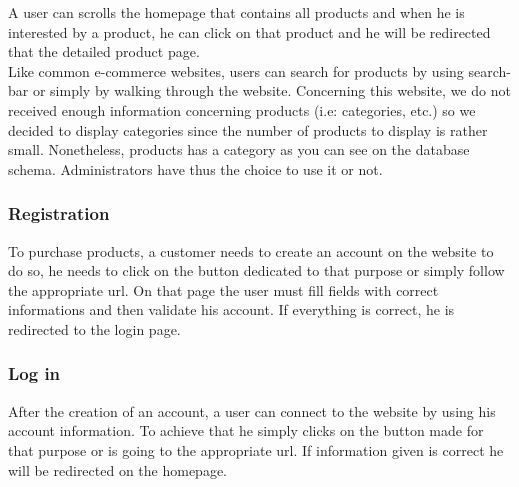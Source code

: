 \documentclass{article}
\begin{document}
A user can scrolls the homepage that contains all products and when he is interested by a product, he can click on that product and he will be redirected that the detailed product page.\\

Like common e-commerce websites, users can search for products by using search-bar or simply by walking through the website. Concerning this website, we do not received enough information concerning products (i.e: categories, etc.) so we decided to display categories since the number of products to display is rather small. Nonetheless, products has a category as you can see on the database schema. Administrators have thus the choice to use it or not.

\subsubsection{Registration}
To purchase products, a customer needs to create an account on the website to do so, he needs to click on the button dedicated to that purpose or simply follow the appropriate url. On that page the user must fill fields with correct informations and then validate his account. If everything is correct, he is redirected to the login page.
 
\subsubsection{Log in}
After the creation of an account, a user can connect to the website by using his account information. To achieve that he simply clicks on the button made for that purpose or is going to the appropriate url. If information given is correct he will be redirected on the homepage.
\end{document}
